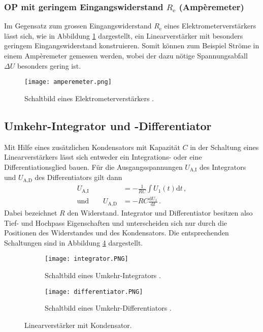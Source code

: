 \documentclass[
  bibliography=totoc,     %
  captions=tableheading,  %
  titlepage=firstiscover, %
]{scrartcl}
\begin{document}
\subsubsection{OP mit geringem Eingangswiderstand $R_\text{e}$ (Ampèremeter)}
\label{subsubsec:amperemeter}
Im Gegensatz zum grossen Eingangswiderstand $R_\text{e}$ eines
Elektrometerverstärkers lässt sich, wie in Abbildung
\ref{fig:amperemeter} dargestellt, ein Linearverstärker mit
besonders geringem Eingangswiderstand konstruieren.
Somit können zum Beispiel Ströme in einem Ampèremeter gemessen werden, wobei
der dazu nötige Spannungsabfall $\Delta U$ besonders gering ist.
\begin{figure}[H]
    \centering
    \texttt{[image: amperemeter.png]}
    \caption{Schaltbild eines Elektrometerverstärkers \cite{V51}.}
    \label{fig:amperemeter}
\end{figure}

\subsection{Umkehr-Integrator und -Differentiator}
\label{subsec:integrator}
Mit Hilfe eines zusätzlichen Kondensators mit Kapazität $C$ in der Schaltung
eines Linearverstärkers lässt sich entweder ein Integrations- oder eine
Differentiationsglied bauen.
Für die Ausgangsspannungen $U_\text{A,I}$ des Integrators und $U_\text{A,D}$
des Differentiators gilt dann
\begin{align*}
    U_\text{A,I} &= - \frac{1}{RC} \int U_1\!(t) \mathup{d}t\,,\\
    \text{und} \qquad U_\text{A,D} &= - RC \frac{\mathup{d}U_1}{\mathup{d}t}\,.
\end{align*}
Dabei bezeichnet $R$ den Widerstand.
Integrator und Differentiator besitzen also Tief- und Hochpass Eigenschaften und
unterscheiden sich nur durch die Positionen des Widerstandes und des Kondensators.
Die entsprechenden Schaltungen sind in Abbildung \ref{fig:integrator} dargestellt.
\begin{figure}[H]
    \begin{subfigure}{.49\linewidth}
        \centering
        \texttt{[image: integrator.PNG]}
        \caption{Schaltbild eines Umkehr-Integrators \cite{V51}.}
        \label{fig:integrator-integrator}
    \end{subfigure}
    \begin{subfigure}{.49\linewidth}
        \centering
        \texttt{[image: differentiator.PNG]}
        \caption{Schaltbild eines Umkehr-Differentiators \cite{V51}.}
        \label{fig:integrator-differentiator}
    \end{subfigure}
    \caption{Linearverstärker mit Kondensator.}
    \label{fig:integrator}
\end{figure}
\end{document}
